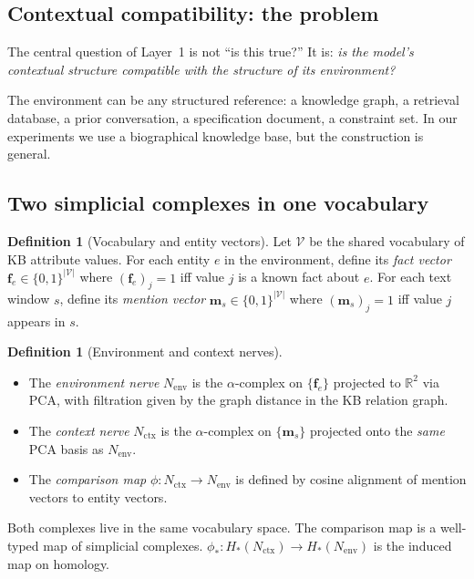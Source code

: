 \documentclass[11pt]{amsart}
\theoremstyle{definition}
\newtheorem{definition}[theorem]{Definition}
\newcommand{\Nctx}{N_{\mathrm{ctx}}}
\newcommand{\Nenv}{N_{\mathrm{env}}}
\begin{document}
\subsection{Contextual compatibility: the problem}

The central question of Layer~1 is not ``is this true?''
It is: \emph{is the model's contextual structure compatible with
the structure of its environment?}

The environment can be any structured reference: a knowledge graph,
a retrieval database, a prior conversation, a specification document,
a constraint set.
In our experiments we use a biographical knowledge base,
but the construction is general.

\subsection{Two simplicial complexes in one vocabulary}

\begin{definition}[Vocabulary and entity vectors]
Let $\mathcal{V}$ be the shared vocabulary of KB attribute values.
For each entity $e$ in the environment, define its
\emph{fact vector} $\mathbf{f}_e \in \{0,1\}^{|\mathcal{V}|}$
where $(\mathbf{f}_e)_j = 1$ iff value $j$ is a known fact about $e$.
For each text window $s$, define its
\emph{mention vector} $\mathbf{m}_s \in \{0,1\}^{|\mathcal{V}|}$
where $(\mathbf{m}_s)_j = 1$ iff value $j$ appears in $s$.
\end{definition}

\begin{definition}[Environment and context nerves]
\label{def:dual-nerve}
\begin{itemize}
\item The \emph{environment nerve} $\Nenv$ is the $\alpha$-complex on
  $\{\mathbf{f}_e\}$ projected to $\mathbb{R}^2$ via PCA,
  with filtration given by the graph distance in the KB relation graph.

\item The \emph{context nerve} $\Nctx$ is the $\alpha$-complex on
  $\{\mathbf{m}_s\}$ projected onto the \emph{same} PCA basis as $\Nenv$.

\item The \emph{comparison map} $\phi: \Nctx \to \Nenv$
  is defined by cosine alignment of mention vectors to entity vectors.
\end{itemize}
\end{definition}

Both complexes live in the same vocabulary space.
The comparison map is a well-typed map of simplicial complexes.
$\phi_*: H_*(\Nctx) \to H_*(\Nenv)$ is the induced map on homology.
\end{document}
